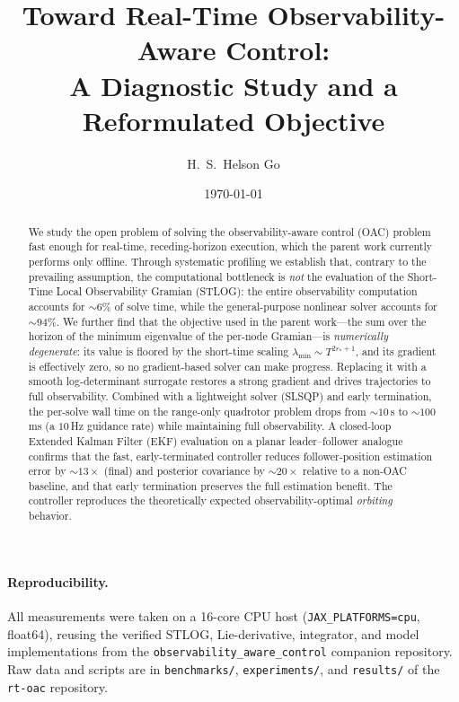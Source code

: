 \documentclass[11pt]{article}
\title{Toward Real-Time Observability-Aware Control:\\
A Diagnostic Study and a Reformulated Objective}
\author{H.~S.~Helson Go}
\date{\today}
\begin{document}
\maketitle

\begin{abstract}
We study the open problem of solving the observability-aware control (OAC) problem fast
enough for real-time, receding-horizon execution, which the parent work currently performs
only offline. Through systematic profiling we establish that, contrary to the prevailing
assumption, the computational bottleneck is \emph{not} the evaluation of the Short-Time
Local Observability Gramian (STLOG): the entire observability computation accounts for
${\sim}6\%$ of solve time, while the general-purpose nonlinear solver accounts for
${\sim}94\%$. We further find that the objective used in the parent work---the sum over the
horizon of the minimum eigenvalue of the per-node Gramian---is \emph{numerically degenerate}:
its value is floored by the short-time scaling $\lambda_{\min}\sim T^{2r_*+1}$, and its
gradient is effectively zero, so no gradient-based solver can make progress. Replacing it
with a smooth log-determinant surrogate restores a strong gradient and drives trajectories to
full observability. Combined with a lightweight solver (SLSQP) and early termination, the
per-solve wall time on the range-only quadrotor problem drops from ${\sim}10$\,s to
${\sim}100$\,ms (a $10$\,Hz guidance rate) while maintaining full observability. A
closed-loop Extended Kalman Filter (EKF) evaluation on a planar leader--follower analogue
confirms that the fast, early-terminated controller reduces follower-position estimation
error by ${\sim}13\times$ (final) and posterior covariance by ${\sim}20\times$ relative to a
non-OAC baseline, and that early termination preserves the full estimation benefit. The
controller reproduces the theoretically expected observability-optimal \emph{orbiting}
behavior.
\end{abstract}

\paragraph{Reproducibility.} All measurements were taken on a 16-core CPU host
(\texttt{JAX\_PLATFORMS=cpu}, float64), reusing the verified STLOG, Lie-derivative,
integrator, and model implementations from the \texttt{observability\_aware\_control}
companion repository. Raw data and scripts are in \texttt{benchmarks/}, \texttt{experiments/},
and \texttt{results/} of the \texttt{rt-oac} repository.
\end{document}
